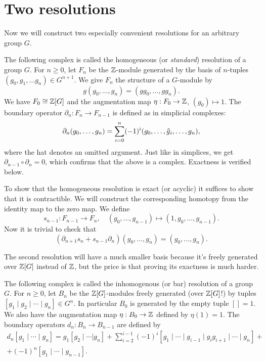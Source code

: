 \section{Two resolutions}

Now we will construct two especially convenient resolutions for an arbitrary group $G$. 

\begin{defn}
    The following complex is called the homogeneous (or \emph{standard}) resolution of a group $G$. For $n\geq 0$, let $F_n$ be the $\mathbb{Z}$-module generated by the basis of $n$-tuples $(g_0,g_1,\ldots g_n)\in G^{n+1}$. We give $F_n$ the structure of a $G$-module by
    \[g(g_0,\ldots,g_n)=(gg_0,\ldots,gg_n).\]
    We have $F_0\cong \mathbb{Z}[G]$ and the augmentation map $\eta:F_0\to \mathbb{Z}$, $(g_0)\mapsto 1$. The boundary operator $\partial_n:F_n\to F_{n-1}$ is defined as in simplicial complexes:
    \[\partial_n(g_0,\ldots,g_n)=\sum_{i=0}^n(-1)^i(g_0,\ldots,\wh{g}_i,\ldots,g_n),\]
    where the hat denotes an omitted argument. Just like in simplices, we get $\partial_{n-1}\circ \partial_n=0$, which confirms that the above is a complex. Exactness is verified below.
\end{defn}

To show that the homogeneous resolution is exact (or acyclic) it suffices to show that it is contractible. We will construct the corresponding homotopy from the identity map to the zero map. We define
\[s_{n-1}:F_{n-1}\to F_n,\quad (g_0,\ldots,g_{n-1})\mapsto (1,g_0,\ldots,g_{n-1}).\]
Now it is trivial to check that
\[(\partial_{n+1}s_n+s_{n-1}\partial_n)(g_0,\ldots,g_n)=(g_0,\ldots,g_n).\]


The second resolution will have a much smaller basis because it's freely generated over $\mathbb{Z}[G]$ instead of $\mathbb{Z}$, but the price is that proving its exactness is much harder.
\begin{defn}
    The following complex is called the inhomogenous (or bar) resolution of a group $G$. For $n\geq 0$, let $B_n$ be the $\mathbb{Z}[G]$-modules freely generated (over $\mathbb{Z}[G]$!) by tuples $[g_1\mid g_2\mid\cdots \mid g_n]\in G^n$. In particular $B_0$ is generated by the empty tuple $[]=1$. We also have the augmentation map $\eta:B_0\to\mathbb{Z}$ defined by $\eta(1)=1$. The boundary operators $d_n:B_n\to B_{n-1}$ are defined by
    \begin{multline}
        d_n[g_1\mid\cdots\mid g_n]=g_1[g_2\mid\cdots|g_n]+\sum_{i=2}^{i-1}(-1)^i[g_1\mid\cdots\mid g_{i-1}\mid g_ig_{i+1}\mid\cdots\mid g_n]+\\+(-1)^n[g_1\mid\cdots\mid g_{n-1}].
    \end{multline}
\end{defn}


